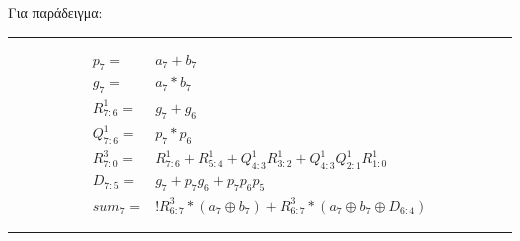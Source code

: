 Για παράδειγμα:\\
\rule{\linewidth}{0.5mm}
\begin{equation*}
\begin{split}
p_7 =& a_7 + b_7\\
g_7 =& a_7 * b_7\\
R^1_{7:6} =& g_7 + g_{6}\\
Q^1_{7:6} =& p_7 * p_{6}\\
R^3_{7:0} =& R^1_{7:6} + R^1_{5:4} + Q^1_{4:3} R^1_{3:2} + Q^1_{4:3} Q^1_{2:1} R^1_{1:0}\\
D_{7:5} =& g_7 + p_7g_{6} + p_7p_{6}p_{5}\\
sum_7 =& !R^3_{6:7} * (a_7 \oplus b_7) + R^3_{6:7} * (a_7 \oplus b_7 \oplus D_{6:4})
\end{split}
\end{equation*}
\rule{\linewidth}{0.5mm}











